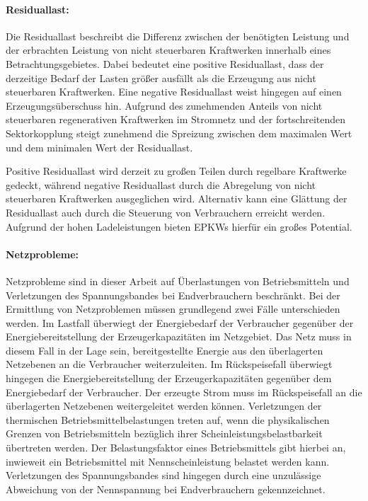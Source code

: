\paragraph{Residuallast:}

Die Residuallast beschreibt die Differenz zwischen der benötigten Leistung und der erbrachten Leistung von nicht steuerbaren Kraftwerken innerhalb eines Betrachtungsgebietes.
Dabei bedeutet eine positive Residuallast, dass der derzeitige Bedarf der Lasten größer ausfällt als die Erzeugung aus nicht steuerbaren Kraftwerken.
Eine negative Residuallast weist hingegen auf einen Erzeugungsüberschuss hin.
Aufgrund des zunehmenden Anteils von nicht steuerbaren regenerativen Kraftwerken im Stromnetz und der fortschreitenden Sektorkopplung steigt zunehmend die Spreizung zwischen dem maximalen Wert und dem minimalen Wert der Residuallast. \cite{Paschotta2020a}\medskip

Positive Residuallast wird derzeit zu großen Teilen durch regelbare Kraftwerke gedeckt, während negative Residuallast durch die Abregelung von nicht steuerbaren Kraftwerken ausgeglichen wird.
Alternativ kann eine Glättung der Residuallast auch durch die Steuerung von Verbrauchern erreicht werden.
Aufgrund der hohen Ladeleistungen bieten \glspl{EPKW} hierfür ein großes Potential. \cite{Paschotta2020a}


\paragraph{Netzprobleme:}

Netzprobleme sind in dieser Arbeit auf Überlastungen von Betriebsmitteln und Verletzungen des Spannungsbandes bei Endverbrauchern beschränkt.
Bei der Ermittlung von Netzproblemen müssen grundlegend zwei Fälle unterschieden werden.
Im Lastfall überwiegt der Energiebedarf der Verbraucher gegenüber der Energiebereitstellung der Erzeugerkapazitäten im Netzgebiet.
Das Netz muss in diesem Fall in der Lage sein, bereitgestellte Energie aus den überlagerten Netzebenen an die Verbraucher weiterzuleiten.
Im Rückspeisefall überwiegt hingegen die Energiebereitstellung der Erzeugerkapazitäten gegenüber dem Energiebedarf der Verbraucher.
Der erzeugte Strom muss im Rückspeisefall an die überlagerten Netzebenen weitergeleitet werden können.
Verletzungen der thermischen Betriebsmittelbelastungen treten auf, wenn die physikalischen Grenzen von Betriebsmitteln bezüglich ihrer Scheinleistungsbelastbarkeit übertreten werden.
Der Belastungsfaktor eines Betriebsmittels gibt hierbei an, inwieweit ein Betriebsmittel mit Nennscheinleistung belastet werden kann.
Verletzungen des Spannungsbandes sind hingegen durch eine unzulässige Abweichung von der Nennspannung bei Endverbrauchern gekennzeichnet. \cite{Agora2019} \cite{Rehtanz2017}


